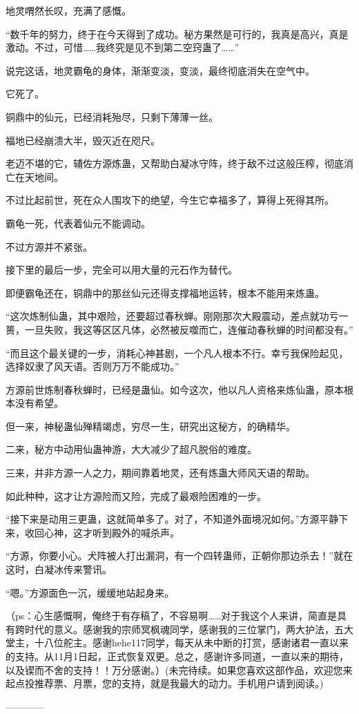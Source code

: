 \begin{this_body}
地灵喟然长叹，充满了感慨。

“数千年的努力，终于在今天得到了成功。秘方果然是可行的，我真是高兴，真是激动。不过，可惜……我终究是见不到第二空窍蛊了……”

说完这话，地灵霸龟的身体，渐渐变淡，变淡，最终彻底消失在空气中。

它死了。

铜鼎中的仙元，已经消耗殆尽，只剩下薄薄一丝。

福地已经崩溃大半，毁灭近在咫尺。

老迈不堪的它，辅佐方源炼蛊，又帮助白凝冰守阵，终于敌不过这般压榨，彻底消亡在天地间。

不过比起前世，死在众人围攻下的绝望，今生它幸福多了，算得上死得其所。

霸龟一死，代表着仙元不能调动。

不过方源并不紧张。

接下里的最后一步，完全可以用大量的元石作为替代。

即便霸龟还在，铜鼎中的那丝仙元还得支撑福地运转，根本不能用来炼蛊。

“这次炼制仙蛊，其中艰险，还要超过春秋蝉。刚刚那次大殿震动，差点就功亏一篑，一旦失败，我这等区区凡体，必然被反噬而亡，连催动春秋蝉的时间都没有。”

“而且这个最关键的一步，消耗心神甚剧，一个凡人根本不行。幸亏我保险起见，选择奴隶了风天语。否则万万不能成功。”

方源前世炼制春秋蝉时，已经是蛊仙。如今这次，他以凡人资格来炼仙蛊，原本根本没有希望。

但一来，神秘蛊仙殚精竭虑，穷尽一生，研究出这秘方，的确精华。

二来，秘方中动用仙蛊神游，大大减少了超凡脱俗的难度。

三来，并非方源一人之力，期间靠着地灵，还有炼蛊大师风天语的帮助。

如此种种，这才让方源险而又险，完成了最艰险困难的一步。

“接下来是动用三更蛊，这就简单多了。对了，不知道外面境况如何。”方源平静下来，收回心神，这才听到殿外的喊杀声。

“方源，你要小心。犬阵被人打出漏洞，有一个四转蛊师，正朝你那边杀去！”就在这时，白凝冰传来警讯。

“嗯。”方源面色一沉，缓缓地站起身来。

（ps：心生感慨啊，俺终于有存稿了，不容易啊……对于我这个人来讲，简直是具有跨时代的意义。感谢我的宗师冥枫魂同学，感谢我的三位掌门，两大护法，五大堂主，十八位舵主。感谢hehe117同学，每天从未中断的打赏，感谢诸君一直以来的支持。从11月1日起，正式恢复双更。总之，感谢许多同道，一直以来的期待，以及锲而不舍的支持！！万分感谢。）(未完待续。如果您喜欢这部作品，欢迎您来起点投推荐票、月票，您的支持，就是我最大的动力。手机用户请到阅读。)

------------

\end{this_body}

